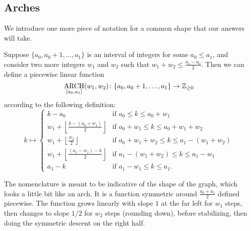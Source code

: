 \subsection{Arches}
We introduce one more piece of notation for a common shape that our answers will take.

\begin{definition}
  Suppose $\{a_0, a_0 + 1, \dots, a_1\}$ is an interval of integers for some $a_0 \le a_1$,
  and consider two more integers $w_1$ and $w_2$ such that $w_1 + w_2 \le \frac{a_1-a_0}{2}$.
  Then we can define a piecewise linear function
  \[ \operatorname*{ARCH}_{[a_0, a_1]}(w_1, w_2) \colon \{a_0, a_0+1, \dots, a_1\} \to \mathbb Z_{\ge 0} \]
  according to the following definition:
  \[
    k \mapsto
    \begin{cases}
      k - a_0 & \text{if }a_0 \le k \le a_0 + w_1 \\
      w_1 + \left\lfloor \frac{k-(a_0+w_1)}{2} \right\rfloor & \text{if } a_0 + w_1 \le k \le a_0 + w_1 + w_2 \\
      w_1 + \left\lfloor \frac{w_2}{2} \right\rfloor & \text{if } a_0 + w_1 + w_2 \le k \le a_1 - (w_1 + w_2)\\
      w_1 + \left\lfloor \frac{(a_1-w_1) - k}{2} \right\rfloor & \text{if } a_1 - (w_1 + w_2) \le k \le a_1 - w_1 \\
      a_1 - k & \text{if }a_1 - w_1 \le k \le a_1.
    \end{cases}
  \]
\end{definition}
The nomenclature is meant to be indicative of the shape of the graph,
which looks a little bit like an arch.
It is a function symmetric around $\frac{a_0+a_1}{2}$ defined piecewise.
The function grows linearly with slope $1$ at the far left for $w_1$ steps,
then changes to slope $1/2$ for $w_2$ steps (rounding down),
before stabilizing, then doing the symmetric descent on the right half.
